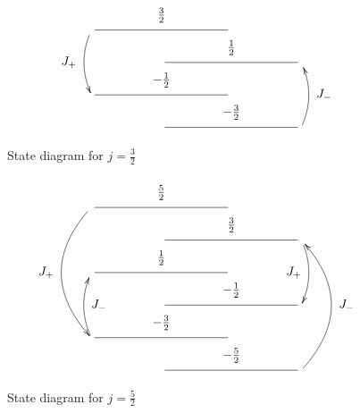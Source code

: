 \begin{figure}[!h]
  \[
  \xymatrix@R=20pt@C=50pt{
    \ar@/_/[dd]_*+{J_+} \ar@{-}[rr]^-*+{\frac32} &                           &  & \\
                                                 & \ar@{-}[rr]^-*+{\frac12}  &  & \\
    \ar@{-}[rr]^-*+{-\frac12}                    &                           &  & \\
                                                 & \ar@{-}[rr]^-*+{-\frac32} &  & \ar@/_/[uu]_*+{J_-}\\
  }
  \]
  \caption{State diagram for $j=\frac32$}
  \label{J3/2Diagram}
\end{figure}
\begin{figure}[!h]
  \[
  \xymatrix@R=20pt@C=50pt{
    \ar@/_2pc/[dddd]_*+{J_+} \ar@{-}[rr]^-*+{\frac52} &                           &  & \\
                                                      & \ar@{-}[rr]^-*+{\frac32}  &  & \ar@/^/[dd]_*+{J_+}\\
    \ar@{-}[rr]^-*+{\frac12}                          &                           &  & \\
                                                      & \ar@{-}[rr]^-*+{-\frac12} &  & \\
    \ar@/^/[uu]_*+{J_-} \ar@{-}[rr]^-*+{-\frac32}     &                           &  & \\
                                                      & \ar@{-}[rr]^-*+{-\frac52} &  & \ar@/_2pc/[uuuu]_*+{J_-}\\
  }
  \]
  \caption{State diagram for $j=\frac52$}
  \label{J5/2Diagram}
\end{figure}

